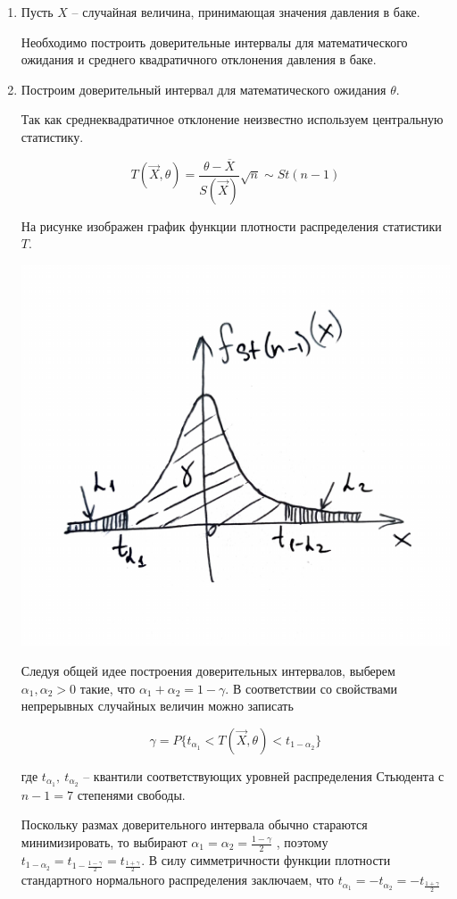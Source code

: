 \documentclass[a4paper,14pt]{extreport} %
\begin{document}
\begin{enumerate}
\item Пусть $X$ -- случайная величина, принимающая значения давления в баке. 

Необходимо построить доверительные интервалы для математического ожидания и среднего квадратичного отклонения давления в баке.

\item Построим доверительный интервал для математического ожидания $\theta$. 

Так как среднеквадратичное отклонение неизвестно используем центральную статистику. 

$$T(\vec X, \theta)=\frac{\theta-\overline X}{S(\vec X)}\sqrt{n} \sim St(n-1)$$

На рисунке изображен график функции плотности распределения статистики $T$. 

\includegraphics[scale=0.45]{2.pdf}

Следуя общей идее построения доверительных интервалов, выберем $\alpha_1,\alpha_2 > 0$ такие, что $\alpha_1+\alpha_2 = 1- \gamma$. В соответствии со свойствами непрерывных случайных величин можно записать

$$\gamma=P\{t_{\alpha_1}<T(\vec X, \theta)<t_{1-\alpha_2}\}$$

где $t_{\alpha_1},~t_{\alpha_2}$ -- квантили соответствующих уровней распределения Стьюдента с $n-1=7$ степенями свободы. 

Поскольку размах доверительного интервала обычно стараются минимизировать, то выбирают
$\alpha_1=\alpha_2=\frac{1-\gamma}{2}$ , поэтому $t_{1-\alpha_2}=t_{1-\frac{1-\gamma}{2}}=t_{\frac{1+\gamma}{2}}$. В силу симметричности функции плотности
стандартного нормального распределения заключаем, что $t_{\alpha_1}=-t_{\alpha_2}=-t_{\frac{1+\gamma}{2}}$ 


\end{enumerate}
\end{document}
